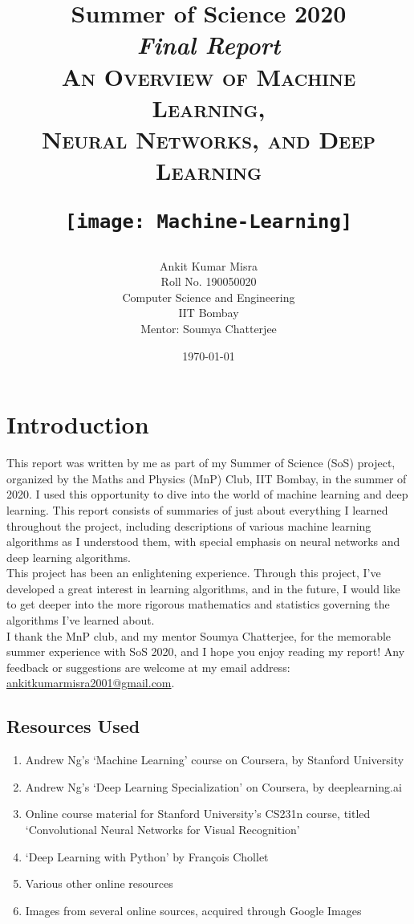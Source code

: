 \documentclass[a4paper, 12pt]{report}
\title{
	{\huge\bf Summer of Science 2020} \\
	[1cm]
	\textit{Final Report} \\
	[1cm]
	{\LARGE\scshape An Overview of Machine Learning, \\ Neural Networks, and Deep Learning} \\
	\begin{figure}[H]
	\centering
	\texttt{[image: Machine-Learning]}
	\end{figure}
}
\author{
	Ankit Kumar Misra \\
	Roll No. 190050020 \\
	Computer Science and Engineering \\
	IIT Bombay\\
	[1cm]
	Mentor: Soumya Chatterjee\\
	[1cm]
}
\date{\today}
\begin{document}

\maketitle

\chapter*{Introduction}
This report was written by me as part of my Summer of Science (SoS) project, organized by the Maths and Physics (MnP) Club, IIT Bombay, in the summer of 2020. I used this opportunity to dive into the world of machine learning and deep learning. This report consists of summaries of just about everything I learned throughout the project, including descriptions of various machine learning algorithms as I understood them, with special emphasis on neural networks and deep learning algorithms.\\
\break
This project has been an enlightening experience. Through this project, I've developed a great interest in learning algorithms, and in the future, I would like to get deeper into the more rigorous mathematics and statistics governing the algorithms I've learned about.\\
\break
I thank the MnP club, and my mentor Soumya Chatterjee, for the memorable summer experience with SoS 2020, and I hope you enjoy reading my report! Any feedback or suggestions are welcome at my email address: \textcolor{blue}{\href{mailto:ankitkumarmisra2001@gmail.com}{ankitkumarmisra2001@gmail.com}}.

\vspace{2.5cm}

\section*{Resources Used}
\vspace{0.7cm}
\begin{enumerate}
\item Andrew Ng's `Machine Learning' course on Coursera, by Stanford University
\item Andrew Ng's `Deep Learning Specialization' on Coursera, by deeplearning.ai
\item Online course material for Stanford University's CS231n course, titled `Convolutional Neural Networks for Visual Recognition'
\item `Deep Learning with Python' by Fran\c{c}ois Chollet
\item Various other online resources
\item Images from several online sources, acquired through Google Images
\end{enumerate}
\end{document}
